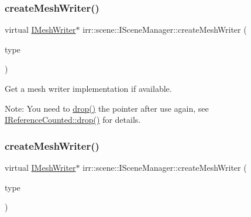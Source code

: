 \subsubsection{\texorpdfstring{create\+Mesh\+Writer()}{createMeshWriter()}\hspace{0.1cm}{\footnotesize\ttfamily [1/2]}}
{\footnotesize\ttfamily virtual \hyperlink{classirr_1_1scene_1_1IMeshWriter}{I\+Mesh\+Writer}$\ast$ irr\+::scene\+::\+I\+Scene\+Manager\+::create\+Mesh\+Writer (\begin{DoxyParamCaption}\item[{\hyperlink{namespaceirr_1_1scene_a431fa15741518ba15f6d5f2608b6cb4e}{E\+M\+E\+S\+H\+\_\+\+W\+R\+I\+T\+E\+R\+\_\+\+T\+Y\+PE}}]{type }\end{DoxyParamCaption})\hspace{0.3cm}{\ttfamily [pure virtual]}}



Get a mesh writer implementation if available. 

Note\+: You need to \hyperlink{classirr_1_1IReferenceCounted_a03856a09355b89d178090c4a5f738543}{drop()} the pointer after use again, see \hyperlink{classirr_1_1IReferenceCounted_a03856a09355b89d178090c4a5f738543}{I\+Reference\+Counted\+::drop()} for details. \mbox{\label{classirr_1_1scene_1_1ISceneManager_ae9a06fb68757381f99cfe11ecbd153e6}} 
\subsubsection{\texorpdfstring{create\+Mesh\+Writer()}{createMeshWriter()}\hspace{0.1cm}{\footnotesize\ttfamily [2/2]}}
{\footnotesize\ttfamily virtual \hyperlink{classirr_1_1scene_1_1IMeshWriter}{I\+Mesh\+Writer}$\ast$ irr\+::scene\+::\+I\+Scene\+Manager\+::create\+Mesh\+Writer (\begin{DoxyParamCaption}\item[{\hyperlink{namespaceirr_1_1scene_a431fa15741518ba15f6d5f2608b6cb4e}{E\+M\+E\+S\+H\+\_\+\+W\+R\+I\+T\+E\+R\+\_\+\+T\+Y\+PE}}]{type }\end{DoxyParamCaption})\hspace{0.3cm}{\ttfamily [pure virtual]}}



